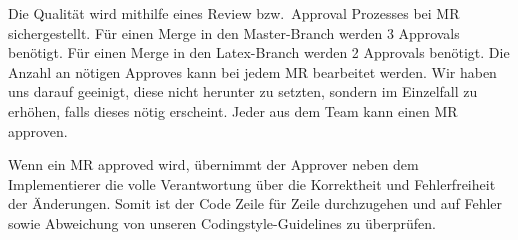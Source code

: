 Die Qualität wird mithilfe eines Review bzw.\ Approval Prozesses bei MR sichergestellt.
Für einen Merge in den Master-Branch werden 3 Approvals benötigt.
Für einen Merge in den Latex-Branch werden 2 Approvals benötigt.
Die Anzahl an nötigen Approves kann bei jedem MR bearbeitet werden.
Wir haben uns darauf geeinigt, diese nicht herunter zu setzten,
sondern im Einzelfall zu erhöhen, falls dieses nötig erscheint.
Jeder aus dem Team kann einen MR approven.

Wenn ein MR approved wird, übernimmt der Approver neben dem Implementierer die volle Verantwortung
über die Korrektheit und Fehlerfreiheit der Änderungen.
Somit ist der Code Zeile für Zeile durchzugehen und auf Fehler sowie Abweichung von
unseren Codingstyle-Guidelines zu überprüfen.



